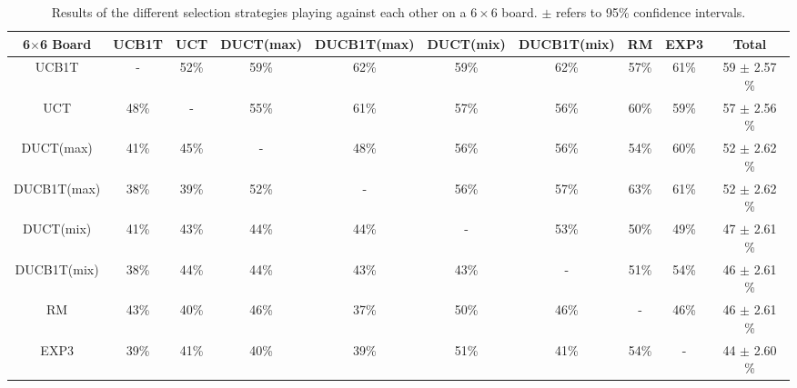 \documentclass{article}
\begin{document}
\begin{table}[h!]\scriptsize
\centering
\begin{tabular}{|c||c|c|c|c|c|c|c|c|c|}
									\hline
	6$\times$6 Board	& UCB1T 	& UCT		& DUCT(max)	& DUCB1T(max)	& DUCT(mix)	& DUCB1T(mix)	& RM	& EXP3	& Total			\\ \hline
	UCB1T							& -				& 52\%	& 59\%			& 62\%				& 59\%			& 62\%				& 57\%& 61\%	& 59 $\pm$ 2.57 \%		\\ \hline
	UCT								& 48\%		& -			& 55\%			& 61\%				& 57\%			& 56\%				& 60\%& 59\%	& 57 $\pm$ 2.56 \%		\\ \hline
	DUCT(max)					& 41\%		& 45\%	& -					& 48\%				& 56\%			& 56\%				& 54\%& 60\%	& 52 $\pm$ 2.62 \%		\\ \hline
	DUCB1T(max)				& 38\%		& 39\%	& 52\%			& -						& 56\%			& 57\%				& 63\%& 61\%	& 52 $\pm$ 2.62 \%		\\ \hline
	DUCT(mix)					& 41\%		& 43\%	& 44\%			& 44\%				& -					& 53\%				& 50\%& 49\%	& 47 $\pm$ 2.61 \%		\\ \hline
	DUCB1T(mix)				& 38\%		& 44\%	& 44\%			& 43\%				& 43\%			& -						& 51\%& 54\%	& 46 $\pm$ 2.61 \%		\\ \hline
	RM								& 43\%		& 40\%	& 46\%			& 37\%				& 50\%			& 46\%				& -		& 46\%	& 46 $\pm$ 2.61 \%		\\ \hline
	EXP3							& 39\%		& 41\%	& 40\%			& 39\%				& 51\%			& 41\%				& 54\%& -			& 44 $\pm$ 2.60 \%		\\ \hline
\end{tabular}
\caption{Results of the different selection strategies playing against each other on a $6\times6$ board. $\pm$ refers to 95\% confidence intervals.}
\label{table:rr_small}
\end{table}


\end{document}
